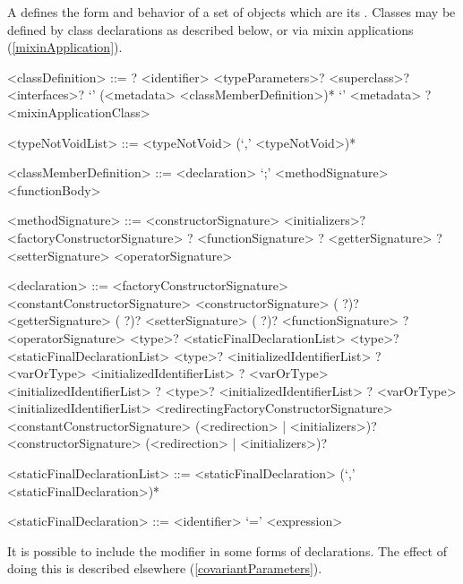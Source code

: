 \documentclass[makeidx]{article}
\begin{document}
\LMHash{}%
A  defines the form and behavior of a set of objects which are its
.
Classes may be defined by class declarations as described below, or via mixin applications (\ref{mixinApplication}).

\begin{grammar}
<classDefinition> ::=
  \ABSTRACT{}? \CLASS{} <identifier> <typeParameters>?
  \gnewline{} <superclass>? <interfaces>?
  \gnewline{} `{' (<metadata> <classMemberDefinition>)* `}'
  \alt <metadata> \ABSTRACT{}? \CLASS{} <mixinApplicationClass>

<typeNotVoidList> ::= <typeNotVoid> (`,' <typeNotVoid>)*

<classMemberDefinition> ::= <declaration> `;'
  \alt <methodSignature> <functionBody>

<methodSignature> ::= <constructorSignature> <initializers>?
  \alt <factoryConstructorSignature>
  \alt \STATIC{}? <functionSignature>
  \alt \STATIC{}? <getterSignature>
  \alt \STATIC{}? <setterSignature>
  \alt <operatorSignature>

<declaration> ::= \EXTERNAL{} <factoryConstructorSignature>
  \alt \EXTERNAL{} <constantConstructorSignature>
  \alt \EXTERNAL{} <constructorSignature>
  \alt (\EXTERNAL{} \STATIC{}?)? <getterSignature>
  \alt (\EXTERNAL{} \STATIC{}?)? <setterSignature>
  \alt (\EXTERNAL{} \STATIC{}?)? <functionSignature>
  \alt \EXTERNAL{}? <operatorSignature>
  \alt \STATIC{} \CONST{} <type>? <staticFinalDeclarationList>
  \alt \STATIC{} \FINAL{} <type>? <staticFinalDeclarationList>
  \alt \STATIC{} \LATE{} \FINAL{} <type>? <initializedIdentifierList>
  \alt \STATIC{} \LATE{}? <varOrType> <initializedIdentifierList>
  \alt \COVARIANT{} \LATE{}? <varOrType> <initializedIdentifierList>
  \alt \LATE{}? \FINAL{} <type>? <initializedIdentifierList>
  \alt \LATE{}? <varOrType> <initializedIdentifierList>
  \alt <redirectingFactoryConstructorSignature>
  \alt <constantConstructorSignature> (<redirection> | <initializers>)?
  \alt <constructorSignature> (<redirection> | <initializers>)?

<staticFinalDeclarationList> ::= \gnewline{}
  <staticFinalDeclaration> (`,' <staticFinalDeclaration>)*

<staticFinalDeclaration> ::= <identifier> `=' <expression>
\end{grammar}

\LMHash{}%
It is possible to include the modifier \COVARIANT{} in some forms of declarations.
The effect of doing this is described elsewhere
(\ref{covariantParameters}).
\end{document}
